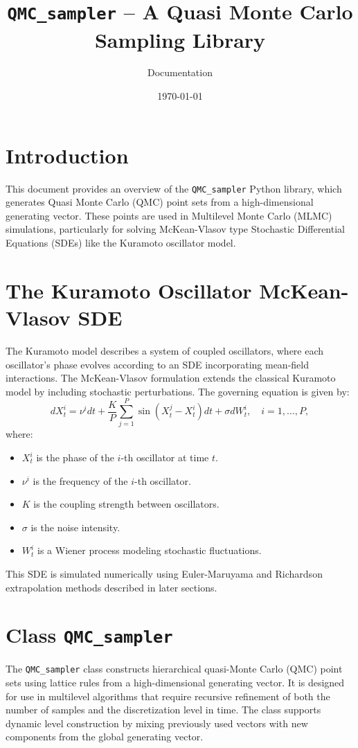 \documentclass{article}
\title{\texttt{QMC\_sampler} -- A Quasi Monte Carlo Sampling Library}
\author{Documentation}
\date{\today}
\begin{document}
\maketitle

\section{Introduction}
This document provides an overview of the \texttt{QMC\_sampler} Python library, which generates Quasi Monte Carlo (QMC) point sets from a high-dimensional generating vector. These points are used in Multilevel Monte Carlo (MLMC) simulations, particularly for solving McKean-Vlasov type Stochastic Differential Equations (SDEs) like the Kuramoto oscillator model.

\section{The Kuramoto Oscillator McKean-Vlasov SDE}
The Kuramoto model describes a system of coupled oscillators, where each oscillator's phase evolves according to an SDE incorporating mean-field interactions. The McKean-Vlasov formulation extends the classical Kuramoto model by including stochastic perturbations. The governing equation is given by:
\begin{equation}
    dX_t^i = \nu^i dt + \frac{K}{P} \sum_{j=1}^{P} \sin(X_t^j - X_t^i) dt + \sigma dW_t^i, \quad i = 1, \dots, P,
\end{equation}
where:
\begin{itemize}
    \item $X_t^i$ is the phase of the $i$-th oscillator at time $t$.
    \item $\nu^i$ is the  frequency of the $i$-th oscillator.
    \item $K$ is the coupling strength between oscillators.
    \item $\sigma$ is the noise intensity.
    \item $W_t^i$ is a Wiener process modeling stochastic fluctuations.
\end{itemize}
This SDE is simulated numerically using Euler-Maruyama and Richardson extrapolation methods described in later sections.

\section{Class \texttt{QMC\_sampler}}

The \texttt{QMC\_sampler} class constructs hierarchical quasi-Monte Carlo (QMC) point sets using lattice rules from a high-dimensional generating vector. It is designed for use in multilevel algorithms that require recursive refinement of both the number of samples and the discretization level in time. The class supports dynamic level construction by mixing previously used vectors with new components from the global generating vector.
\end{document}
